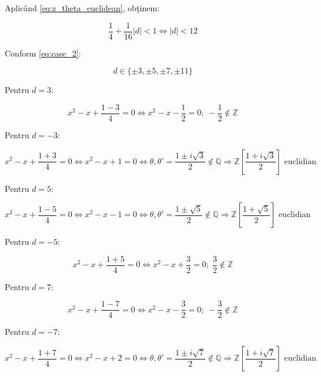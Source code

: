 \documentclass[12pt]{article}
\begin{document}
Aplicând \eqref{eq:z_theta_euclidean}, obţinem:

\begin{equation}
    \frac{1}{4} + \frac{1}{16}|d| < 1 \Leftrightarrow |d| < 12
\end{equation}

Conform \eqref{eq:case_2}:

\begin{equation*}
    d \in \{\pm 3, \pm 5, \pm 7, \pm 11\}
\end{equation*}

Pentru $d = 3$:

\begin{equation*}
    x^2 - x + \frac{1 - 3}{4} = 0
    \Leftrightarrow x^2 - x - \frac{1}{2} = 0; \; -\frac{1}{2} \notin \mathbb{Z}
\end{equation*}

Pentru $d = -3$:

\begin{equation}
    x^2 - x + \frac{1 + 3}{4} = 0
    \Leftrightarrow x^2 - x + 1 = 0
    \Leftrightarrow \theta, \theta' = \frac{1 \pm i\sqrt{3}}{2} \notin \mathbb{Q}
    \Rightarrow \boxed{\mathbb{Z}\left[\frac{1 + i\sqrt{3}}{2}\right] \text{ euclidian}}
\end{equation}

Pentru $d = 5$:

\begin{equation}
    x^2 - x + \frac{1 - 5}{4} = 0
    \Leftrightarrow x^2 - x - 1 = 0
    \Leftrightarrow \theta, \theta' = \frac{1 \pm \sqrt{5}}{2} \notin \mathbb{Q}
    \Rightarrow \boxed{\mathbb{Z}\left[\frac{1 + \sqrt{5}}{2}\right] \text{ euclidian}}
\end{equation}

Pentru $d = -5$:

\begin{equation*}
    x^2 - x + \frac{1 + 5}{4} = 0
    \Leftrightarrow x^2 - x + \frac{3}{2} = 0; \; \frac{3}{2} \notin \mathbb{Z}
\end{equation*}

Pentru $d = 7$:

\begin{equation*}
    x^2 - x + \frac{1 - 7}{4} = 0
    \Leftrightarrow x^2 - x - \frac{3}{2} = 0; \; -\frac{3}{2} \notin \mathbb{Z}
\end{equation*}

Pentru $d = -7$:

\begin{equation}
    x^2 - x + \frac{1 + 7}{4} = 0
    \Leftrightarrow x^2 - x + 2 = 0
    \Leftrightarrow \theta, \theta' = \frac{1 \pm i\sqrt{7}}{2} \notin \mathbb{Q}
    \Rightarrow \boxed{\mathbb{Z}\left[\frac{1 + i\sqrt{7}}{2}\right] \text{ euclidian}}
\end{equation}
\end{document}
